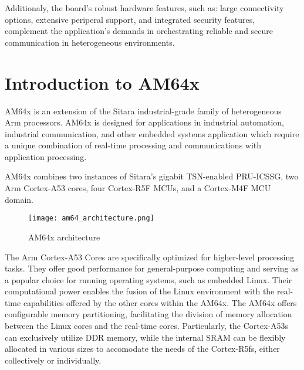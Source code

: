 Additionaly, the board's robust hardware features, such as: large connectivity
options, extensive periperal support, and integrated security features,
complement the application's demands in orchestrating reliable and secure
communication in heterogeneous environments.

\section{Introduction to AM64x}

AM64x is an extension of the Sitara industrial-grade family of heterogeneous
Arm processors. \cite{AM64_datasheet}
AM64x is designed for applications in industrial automation, industrial
communication, and other embedded systems application which require a unique
combination of real-time processing and communications with application
processing. 

AM64x combines two instances of Sitara's gigabit TSN-enabled PRU-ICSSG,
two Arm Cortex-A53 cores, four Cortex-R5F MCUs, and a Cortex-M4F MCU
domain.

\begin{figure}[htb]
    \centering
    \texttt{[image: am64\_architecture.png]}
    \caption{AM64x architecture}
\end{figure}

The Arm Cortex-A53 Cores are specifically optimized for higher-level
processing tasks.
They offer good performance for general-purpose computing and serving as a
popular choice for running operating systems, such as embedded Linux.
Their computational power enables the fusion of the Linux environment with the
real-time capabilities offered by the other cores within the AM64x.
The AM64x offers configurable memory partitioning, facilitating the division
of memory allocation between the Linux cores and the real-time cores.
Particularly, the Cortex-A53s can exclusively utilize DDR memory, while 
the internal SRAM can be flexibly allocated in various sizes to accomodate
the needs of the Cortex-R5fs, either collectively or individually.

